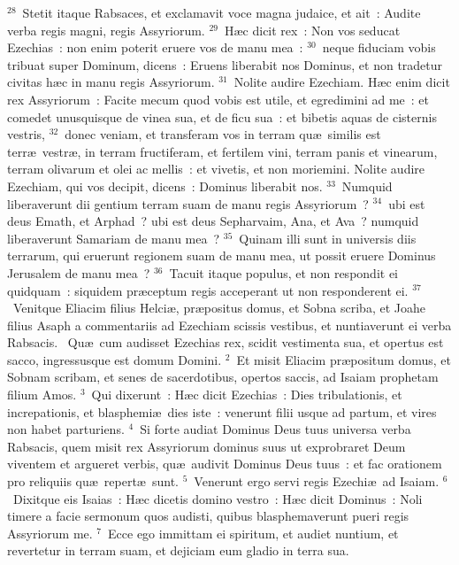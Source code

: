 ${}^{28}$~Stetit itaque Rabsaces, et exclamavit voce magna judaice, et ait~: Audite verba regis magni, regis Assyriorum.
${}^{29}$~H\ae c dicit rex~: Non vos seducat Ezechias~: non enim poterit eruere vos de manu mea~:
${}^{30}$~neque fiduciam vobis tribuat super Dominum, dicens~: Eruens liberabit nos Dominus, et non tradetur civitas h\ae c in manu regis Assyriorum.
${}^{31}$~Nolite audire Ezechiam. H\ae c enim dicit rex Assyriorum~: Facite mecum quod vobis est utile, et egredimini ad me~: et comedet unusquisque de vinea sua, et de ficu sua~: et bibetis aquas de cisternis vestris,
${}^{32}$~donec veniam, et transferam vos in terram qu\ae\ similis est terr\ae\ vestr\ae , in terram fructiferam, et fertilem vini, terram panis et vinearum, terram olivarum et olei ac mellis~: et vivetis, et non moriemini. Nolite audire Ezechiam, qui vos decipit, dicens~: Dominus liberabit nos.
${}^{33}$~Numquid liberaverunt dii gentium terram suam de manu regis Assyriorum~?
${}^{34}$~ubi est deus Emath, et Arphad~? ubi est deus Sepharvaim, Ana, et Ava~? numquid liberaverunt Samariam de manu mea~?
${}^{35}$~Quinam illi sunt in universis diis terrarum, qui eruerunt regionem suam de manu mea, ut possit eruere Dominus Jerusalem de manu mea~?
${}^{36}$~Tacuit itaque populus, et non respondit ei quidquam~: siquidem pr\ae ceptum regis acceperant ut non responderent ei.
${}^{37}$~Venitque Eliacim filius Helci\ae , pr\ae positus domus, et Sobna scriba, et Joahe filius Asaph a commentariis ad Ezechiam scissis vestibus, et nuntiaverunt ei verba Rabsacis.
~Qu\ae\ cum audisset Ezechias rex, scidit vestimenta sua, et opertus est sacco, ingressusque est domum Domini.
${}^{2}$~Et misit Eliacim pr\ae positum domus, et Sobnam scribam, et senes de sacerdotibus, opertos saccis, ad Isaiam prophetam filium Amos.
${}^{3}$~Qui dixerunt~: H\ae c dicit Ezechias~: Dies tribulationis, et increpationis, et blasphemi\ae\ dies iste~: venerunt filii usque ad partum, et vires non habet parturiens.
${}^{4}$~Si forte audiat Dominus Deus tuus universa verba Rabsacis, quem misit rex Assyriorum dominus suus ut exprobraret Deum viventem et argueret verbis, qu\ae\ audivit Dominus Deus tuus~: et fac orationem pro reliquiis qu\ae\ repert\ae\ sunt.
${}^{5}$~Venerunt ergo servi regis Ezechi\ae\ ad Isaiam.
${}^{6}$~Dixitque eis Isaias~: H\ae c dicetis domino vestro~: H\ae c dicit Dominus~: Noli timere a facie sermonum quos audisti, quibus blasphemaverunt pueri regis Assyriorum me.
${}^{7}$~Ecce ego immittam ei spiritum, et audiet nuntium, et revertetur in terram suam, et dejiciam eum gladio in terra sua.


